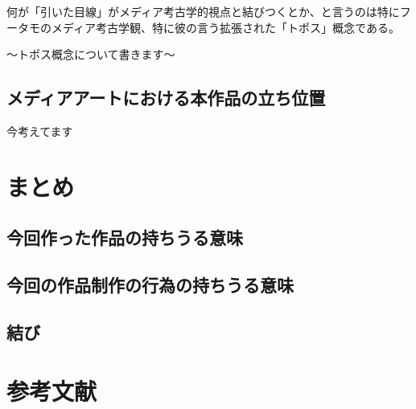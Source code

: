 何が「引いた目線」がメディア考古学的視点と結びつくとか、と言うのは特にフータモのメディア考古学観、特に彼の言う拡張された「トポス」概念である。

〜トポス概念について書きます〜

\section{メディアアートにおける本作品の立ち位置}\label{ux30e1ux30c7ux30a3ux30a2ux30a2ux30fcux30c8ux306bux304aux3051ux308bux672cux4f5cux54c1ux306eux7acbux3061ux4f4dux7f6e}

今考えてます

\chapter{まとめ}\label{ux307eux3068ux3081}

\section{今回作った作品の持ちうる意味}\label{ux4ecaux56deux4f5cux3063ux305fux4f5cux54c1ux306eux6301ux3061ux3046ux308bux610fux5473}

\section{今回の作品制作の行為の持ちうる意味}\label{ux4ecaux56deux306eux4f5cux54c1ux5236ux4f5cux306eux884cux70baux306eux6301ux3061ux3046ux308bux610fux5473}

\section{結び}\label{ux7d50ux3073}

\chapter*{参考文献}\label{ux53c2ux8003ux6587ux732e}

\hypertarget{refs}{}
